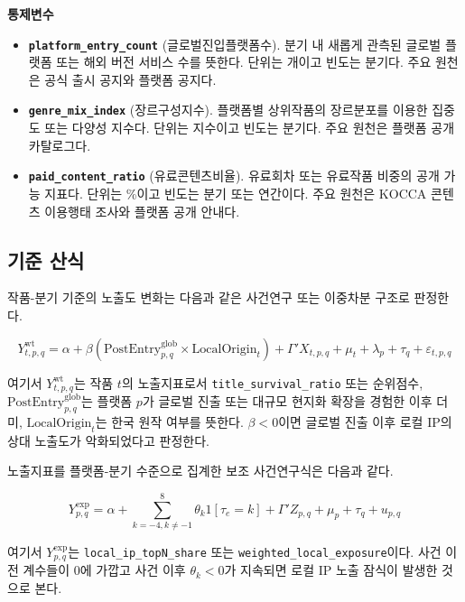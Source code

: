 \documentclass[11pt,a4paper]{report}
\newenvironment{summarylist}{\begin{itemize}[leftmargin=1.8em,itemsep=0.35em,topsep=0.35em]\RaggedRight}{\end{itemize}}
\begin{document}
\noindent\textbf{통제변수}
\begin{summarylist}
  \item \textbf{\texttt{platform\_entry\_count}} (글로벌진입플랫폼수). 분기 내 새롭게 관측된 글로벌 플랫폼 또는 해외 버전 서비스 수를 뜻한다. 단위는 개이고 빈도는 분기다. 주요 원천은 공식 출시 공지와 플랫폼 공지다.
  \item \textbf{\texttt{genre\_mix\_index}} (장르구성지수). 플랫폼별 상위작품의 장르분포를 이용한 집중도 또는 다양성 지수다. 단위는 지수이고 빈도는 분기다. 주요 원천은 플랫폼 공개 카탈로그다.
  \item \textbf{\texttt{paid\_content\_ratio}} (유료콘텐츠비율). 유료회차 또는 유료작품 비중의 공개 가능 지표다. 단위는 \%이고 빈도는 분기 또는 연간이다. 주요 원천은 KOCCA 콘텐츠 이용행태 조사와 플랫폼 공개 안내다.
\end{summarylist}
\endgroup

\subsection{기준 산식}
작품-분기 기준의 노출도 변화는 다음과 같은 사건연구 또는 이중차분 구조로 판정한다.

\begin{equation}
\label{eq:webtoon_did}
Y_{t,p,q}^{\mathrm{wt}} = \alpha + \beta \left(\mathrm{PostEntry}_{p,q}^{\mathrm{glob}} \times \mathrm{LocalOrigin}_t\right) + \Gamma' X_{t,p,q} + \mu_t + \lambda_p + \tau_q + \varepsilon_{t,p,q}
\end{equation}

여기서 $Y_{t,p,q}^{\mathrm{wt}}$는 작품 $t$의 노출지표로서 \texttt{title\_survival\_ratio} 또는 순위점수, $\mathrm{PostEntry}_{p,q}^{\mathrm{glob}}$는 플랫폼 $p$가 글로벌 진출 또는 대규모 현지화 확장을 경험한 이후 더미, $\mathrm{LocalOrigin}_t$는 한국 원작 여부를 뜻한다. $\beta < 0$이면 글로벌 진출 이후 로컬 IP의 상대 노출도가 악화되었다고 판정한다.

노출지표를 플랫폼-분기 수준으로 집계한 보조 사건연구식은 다음과 같다.

\begin{equation}
\label{eq:webtoon_event_study}
Y_{p,q}^{\mathrm{exp}} = \alpha + \sum_{k=-4, k \neq -1}^{8}\theta_k 1[\tau_e = k] + \Gamma' Z_{p,q} + \mu_p + \tau_q + u_{p,q}
\end{equation}

여기서 $Y_{p,q}^{\mathrm{exp}}$는 \texttt{local\_ip\_topN\_share} 또는 \texttt{weighted\_local\_exposure}이다. 사건 이전 계수들이 0에 가깝고 사건 이후 $\theta_k < 0$가 지속되면 로컬 IP 노출 잠식이 발생한 것으로 본다.
\end{document}
